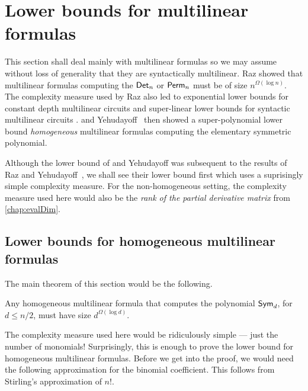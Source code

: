 \chapter{Lower bounds for multilinear formulas}\label{chap:multilinear-formulas}

This section shall deal mainly with multilinear formulas so we may assume without loss of generality that they are syntactically multilinear. 
Raz \cite{raz2004} showed that multilinear formulas computing the $\operatorname{\mathsf{Det}}_n$ or $\operatorname{\mathsf{Perm}}_n$ must be of size $n^{\Omega(\log n)}$. 
The complexity measure used by Raz also led to exponential lower bounds for constant depth multilinear circuits \cite{raz-yehudayoff} and super-linear lower bounds for syntactic multilinear circuits \cite{RSY08}. 
\Hrubes and Yehudayoff~\cite{HY11a} then showed a super-polynomial lower bound \emph{homogeneous} multilinear formulas computing the elementary symmetric polynomial.

Although the lower bound of \Hrubes and Yehudayoff was subsequent to the results of Raz and Yehudayoff~\cite{raz2004,raz-yehudayoff}, we shall see their lower bound first which uses a suprisingly simple complexity measure. For the non-homogeneous setting, the complexity measure used here would also be the \emph{rank of the partial derivative matrix} from \autoref{chap:evalDim}. 


\section{Lower bounds for homogeneous multilinear formulas}

The main theorem of this section would be the following.

\begin{theorem}[\cite{HY11a}]\label{thm:Hrubes-Yehudayoff}
Any homogeneous multilinear formula that computes the polynomial $\operatorname{\mathsf{Sym}}_d$, for $d \leq n/2$, must have size $d^{\Omega(\log d)}$. 
\end{theorem}

The complexity measure used here would be ridiculously simple --- just the number of monomials!
Surprisingly, this is enough to prove the lower bound for homogeneous multilinear formulas. Before we get into the proof, we would need the following approximation for the binomial coefficient. This follows from Stirling's approximation of $n!$. 

